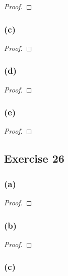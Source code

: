 \documentclass[14pt]{extarticle}
\begin{document}
\begin{proof}

\end{proof}

\subsubsection{(c)}

\begin{proof}

\end{proof}

\subsubsection{(d)}

\begin{proof}

\end{proof}

\subsubsection{(e)}

\begin{proof}

\end{proof}

\subsection{Exercise 26}

\subsubsection{(a)}

\begin{proof}

\end{proof}

\subsubsection{(b)}

\begin{proof}

\end{proof}

\subsubsection{(c)}
\end{document}
